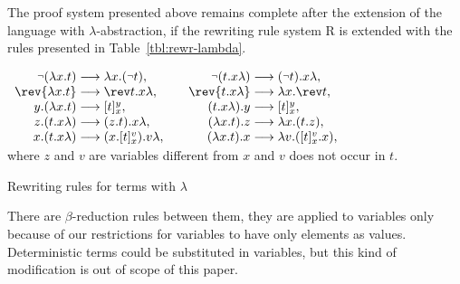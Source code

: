 The proof system presented above  remains complete after the extension of the
language with $\lambda$-abstraction, if the rewriting rule system \C R is
extended with the rules presented in Table~\ref {tbl:rewr-lambda}.
\begin{table}[htb]
\hspace*{\fill}\(
\begin{array}{r@{\;\rewr\;}l@{\qquad}r@{\;\rewr\;}l}
\Neg(\lambda x.t) & \lambda x.(\Neg t), & \Neg(t.x\lambda) & (\Neg t).x\lambda,\\
\rev{\lambda x.t} & \rev t.x\lambda,    & \rev{t.x\lambda} & \lambda x.\rev t,\\
y.(\lambda x.t) & \varre tyx,     & (t.x\lambda).y  & \varre tyx,\\
z.(t.x\lambda)  & (z.t).x\lambda, & (\lambda x.t).z & \lambda x.(t.z),\\
x.(t.x\lambda)  & (x.\varre tvx).v\lambda, & (\lambda x.t).x & \lambda v.(\varre tvx.x),\\ 
\end{array}\)\hspace*{\fill}\\[1ex]
where $z$ and $v$ are variables different from $x$ and $v$ does not
occur in $t$.
\caption{Rewriting rules for terms with $\lambda$}\label{tbl:rewr-lambda}
\end{table}

There are $\beta$-reduction rules between them, they are applied to variables
only because of our restrictions for variables to have only elements as
values.  Deterministic terms could be substituted in variables, but this kind
of modification is out of scope of this paper.

